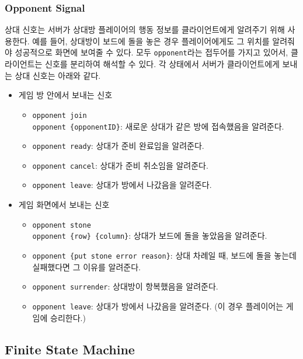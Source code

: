 \documentclass[a4paper, 10pt]{article}
\begin{document}
\subsubsection{Opponent Signal}
상대 신호는 서버가 상대방 플레이어의 행동 정보를 클라이언트에게 알려주기 위해
사용한다. 예를 들어, 상대방이 보드에 돌을 놓은 경우 플레이어에게도 그 위치를
알려줘야 성공적으로 화면에 보여줄 수 있다. 모두 \texttt{opponent}라는 접두어를
가지고 있어서, 클라이언트는 신호를 분리하여 해석할 수 있다.
각 상태에서 서버가 클라이언트에게 보내는 상대 신호는 아래와 같다.
\begin{itemize}
  \item 게임 방 안에서 보내는 신호
  \begin{itemize}
    \item \texttt{opponent join\\opponent \{opponentID\}}: 새로운 상대가 같은 방에 접속했음을 알려준다.
    \item \texttt{opponent ready}: 상대가 준비 완료임을 알려준다.
    \item \texttt{opponent cancel}: 상대가 준비 취소임을 알려준다.
    \item \texttt{opponent leave}: 상대가 방에서 나갔음을 알려준다.
  \end{itemize}
  \item 게임 화면에서 보내는 신호
  \begin{itemize}
    \item \texttt{opponent stone\\opponent \{row\} \{column\}}: 상대가 보드에 돌을 놓았음을 알려준다.
    \item \texttt{opponent \{put stone error reason\}}: 상대 차례일 때, 보드에 돌을 놓는데 실패했다면 그 이유를 알려준다.
    \item \texttt{opponent surrender}: 상대방이 항복했음을 알려준다.
    \item \texttt{opponent leave}: 상대가 방에서 나갔음을 알려준다. (이 경우 플레이어는 게임에 승리한다.)
  \end{itemize}
\end{itemize}

\subsection{Finite State Machine}
\end{document}
